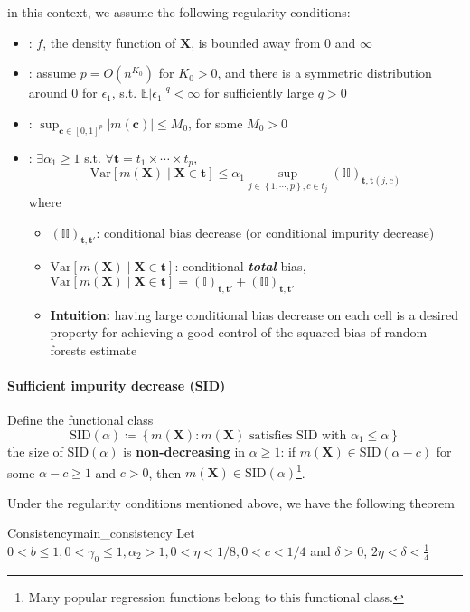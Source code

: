 \documentclass[twoside]{article}
\begin{document}
in this context, we assume the following regularity conditions:
\begin{itemize}
    \item {}: $f$, the density function of $\mathbf{X}$, is bounded away from $0$ and $\infty$
    \item {}: assume $p=O(n^{K_0})$ for $K_0>0$, and there is a symmetric distribution around $0$ for $\epsilon_1$, s.t. $\mathbb{E}\left\vert \epsilon_1 \right\vert^q < \infty$ for sufficiently large $q>0$
    \item {}: $\sup_{\mathbf{c}\in [0,1]^p}\left\vert m(\mathbf{c}) \right\vert \leq M_0$, for some $M_0>0$
    \item {}: $\exists \alpha_1\geq 1$ s.t. $\forall \mathbf{t} = t_1\times \cdots \times t_p$, $$ \mathrm{Var}\left[m(\mathbf{X})\mid \mathbf{X}\in\mathbf{t}\right] \leq \alpha_1 \sup_{j\in \left\{1,\cdots, p \right\}, c\in t_j} \left(\mathbb{II}\right)_{\mathbf{t,t}(j,c)}$$where 
    \begin{itemize}
        \item $\left( \mathbb{II} \right)_{\mathbf{t,t}'}$: conditional bias decrease (or conditional impurity decrease)
        \item $\mathrm{Var}\left[m(\mathbf{X})\mid \mathbf{X}\in\mathbf{t}\right]$: conditional \textbf{\textit{total}} bias, $\mathrm{Var}\left[m(\mathbf{X})\mid \mathbf{X}\in\mathbf{t}\right]= \left( \mathbb{I} \right)_{\mathbf{t,t}'}+\left( \mathbb{II} \right)_{\mathbf{t,t}'}$
        \item \textbf{Intuition:} having large conditional bias decrease on each cell is a desired property for achieving a good control of the squared bias of random forests estimate
    \end{itemize}
\end{itemize}

\paragraph*{Sufficient impurity decrease (SID)}
Define the functional class 
$$
\mathrm{SID}(\alpha) \coloneq \left\{ m(\mathbf{X}): m(\mathbf{X}) \text{ satisfies SID with }\alpha_1 \leq \alpha \right\}
$$
the size of $\mathrm{SID}(\alpha)$ is \textbf{non-decreasing} in $\alpha \geq 1$: if $m(\mathbf{X})\in \mathrm{SID}(\alpha -c)$ for some $\alpha-c\geq 1$ and $c>0$, then $m(\mathbf{X})\in \mathrm{SID}(\alpha)$\footnote{Many popular regression functions belong to this functional class.}.

Under the regularity conditions mentioned above, we have the following theorem
\begin{theorem}{Consistency}{main_consistency}
    Let $0<b\leq 1,0<\gamma_0\leq 1,\alpha_2 >1,0<\eta<1/8,0<c<1/4$ and $\delta>0$, $2\eta < \delta <\frac{1}{4}$
    
\end{theorem}

\newpage


\end{document}
